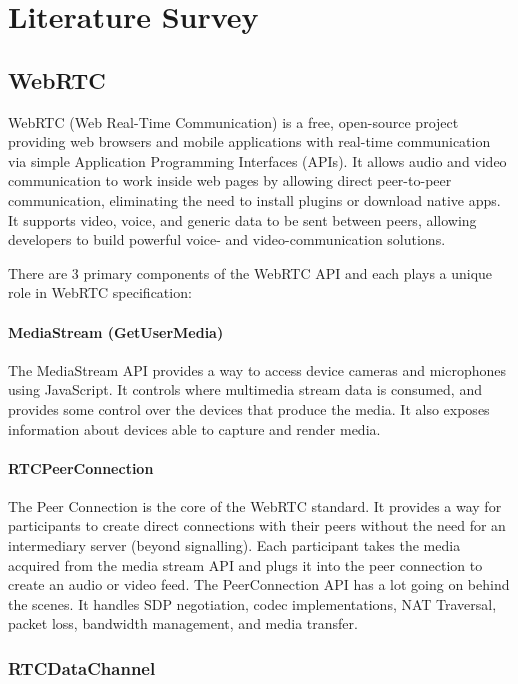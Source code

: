\chapter{Literature Survey}

\section{WebRTC}

WebRTC (Web Real-Time Communication) is a free, open-source project providing web browsers and 
mobile applications with real-time communication via simple Application Programming Interfaces (APIs). 
It allows audio and video communication to work inside web pages by allowing direct peer-to-peer 
communication, eliminating the need to install plugins or download native apps.
It supports video, voice, and generic data to be sent between peers, allowing developers 
to build powerful voice- and video-communication solutions.~\cite{wikiWebRTC}

There are 3 primary components of the WebRTC API and each plays a unique role in WebRTC specification:

\subsubsection{MediaStream (GetUserMedia)}

The MediaStream API provides a way to access device cameras and microphones using JavaScript. 
It controls where multimedia stream data is consumed, and provides some control over the devices 
that produce the media. It also exposes information about devices able to capture and render media.

\subsubsection{RTCPeerConnection}

The Peer Connection is the core of the WebRTC standard. It provides a way for participants to 
create direct connections with their peers without the need for an intermediary 
server (beyond signalling). Each participant takes the media acquired from the media 
stream API and plugs it into the peer connection to create an audio or video feed.  
The PeerConnection API has a lot going on behind the scenes. It handles SDP negotiation, 
codec implementations, NAT Traversal, packet loss, bandwidth management, and media transfer.

\subsection{RTCDataChannel}

